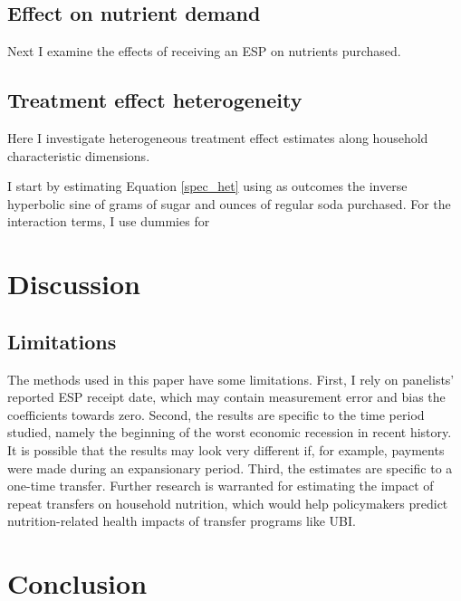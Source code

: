 \documentclass[12pt]{article}
\begin{document}
\subsection{Effect on nutrient demand}

Next I examine the effects of receiving an ESP on nutrients purchased.


\subsection{Treatment effect heterogeneity}

Here I investigate heterogeneous treatment effect estimates along household characteristic dimensions.

I start by estimating Equation \ref{spec_het} using as outcomes the inverse hyperbolic sine of grams of sugar and ounces of regular soda purchased. For the interaction terms, I use dummies for

\section{Discussion} \label{discussion}



\subsection{Limitations}

The methods used in this paper have some limitations. First, I rely on panelists' reported ESP receipt date, which may contain measurement error and bias the coefficients towards zero. Second, the results are specific to the time period studied, namely the beginning of the worst economic recession in recent history. It is possible that the results may look very different if, for example, payments were made during an expansionary period. Third, the estimates are specific to a one-time transfer. Further research is warranted for estimating the impact of repeat transfers on household nutrition, which would help policymakers predict nutrition-related health impacts of transfer programs like UBI.


\section{Conclusion} \label{conclusion}
\end{document}
